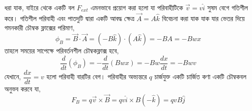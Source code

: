\documentclass{article}
\begin{document}
ধরা যাক, বাইরে থেকে একটি বল $ F_{ext} $ এমনভাবে প্রয়োগ করা হলো যা পরিবাহীটিকে $ \vec{v} = v\hat{i}$ সুষম বেগে গতিশীল করে। গতিশীল পরিবাহী এবং পাতদুটি দ্বারা একটি আবদ্ধ ক্ষেত্র $ \vec{A} = A\hat{k} $ বিবেচনা করা যাক যাক যার ভেতর দিয়ে গমনকারী চৌম্বক ফ্লাক্সের পরিমাণ,
\[\phi_{B} = \vec{B}\cdot \vec{A} = (-B\hat{k})\cdot (A\hat{k}) = -BA=-Bwx\]
তাহলে সময়ের সাপেক্ষে পরিবর্তনশীল চৌম্বকফ্লাক্স হবে,
\[ \dfrac{d}{dt}(\phi_{B}) = -\dfrac{d}{dt}(Bwx) = -Bw\dfrac{dx}{dt}=-Bwv\]
যেখানে, $ \dfrac{dx}{dt} = v $ হলো পরিবাহী বারটির বেগ। পরিবাহীর অভ্যন্তরে $ q $ চার্জযুক্ত একটি চার্জিত কণা একটি চৌম্বকবল অনুভব করবে যা, 
\[F_{B} = q\vec{v}\times\vec{B} = qv\hat{i}\times B(-\hat{k})= qvB\hat{j}\]
\end{document}
